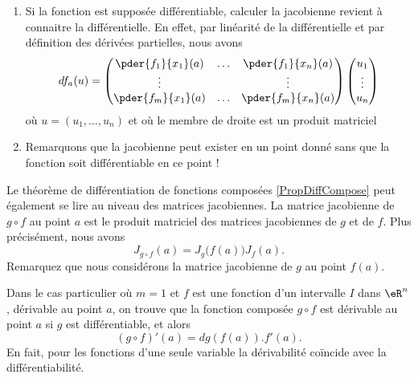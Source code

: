 \begin{remark}
	\begin{enumerate}
		\item Si la fonction est supposée différentiable, calculer la
		      jacobienne revient à connaitre la différentielle. En effet, par
		      linéarité de la différentielle et par définition des dérivées
		      partielles, nous avons
		      \begin{equation*}
			      d f_a (u) =%
			      \begin{pmatrix}
				      \pder {f_1} {x_1}(a) & \ldots & \pder {f_1} {x_n}(a) \\
				      \vdots               &        & \vdots               \\
				      \pder {f_m} {x_1}(a) & \ldots & \pder {f_m} {x_n}(a)
			      \end{pmatrix}
			      \begin{pmatrix}u_1\\\vdots\\u_n\end{pmatrix}
		      \end{equation*}
		      où \( u = (u_1, \ldots, u_n)\) et où le membre de droite est un
		      produit matriciel

		\item Remarquons que la jacobienne peut exister en un point donné
		      sans que la fonction soit différentiable en ce point !
	\end{enumerate}
\end{remark}


\begin{normaltext}      \label{NORMooKBJVooDDDmOa}
	Le théorème de différentiation de fonctions composées \ref{PropDiffCompose} peut également se lire au niveau des matrices jacobiennes. La matrice jacobienne de \( g\circ f\) au point \( a\) est le produit matriciel des matrices jacobiennes de \( g\) et de \( f\). Plus précisément, nous avons
	\begin{equation}
		J_{g\circ f}(a)=J_g\big( f(a) \big)J_f(a).
	\end{equation}
	Remarquez que nous considérons la matrice jacobienne de \( g\) au point \( f(a)\).

	Dans le cas particulier où \( m=1\) et \( f\) est une fonction d'un intervalle \( I\) dans \( \eR^n\), dérivable au point \( a\), on trouve que la fonction composée \( g\circ f\) est dérivable au point \( a\) si \( g\) est différentiable, et alors
	\[
		(g\circ f)'(a)= dg\left(f(a)\right).f'(a).
	\]
	En fait, pour les fonctions d'une seule variable la dérivabilité coïncide avec la différentiabilité.
\end{normaltext}
